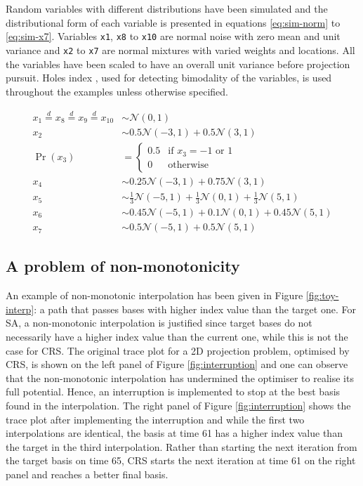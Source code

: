 Random variables with different distributions have been simulated and
the distributional form of each variable is presented in equations
\ref{eq:sim-norm} to \ref{eq:sim-x7}. Variables \texttt{x1}, \texttt{x8}
to \texttt{x10} are normal noise with zero mean and unit variance and
\texttt{x2} to \texttt{x7} are normal mixtures with varied weights and
locations. All the variables have been scaled to have an overall unit
variance before projection pursuit. Holes index \citep{cook2008grand},
used for detecting bimodality of the variables, is used throughout the
examples unless otherwise specified.

\begin{align}
x_1 \overset{d}{=} x_8 \overset{d}{=} x_9 \overset{d}{=} x_{10}& \sim \mathcal{N}(0, 1) \label{eq:sim-norm} \\
x_2 &\sim 0.5 \mathcal{N}(-3, 1) + 0.5 \mathcal{N}(3, 1)\label{eq:sim-x2}\\
\Pr(x_3) &= 
\begin{cases}
0.5 & \text{if $x_3 = -1$ or $1$}\\
0 & \text{otherwise}
\end{cases}\label{eq:sim-x3}\\
x_4 &\sim 0.25 \mathcal{N}(-3, 1) + 0.75 \mathcal{N}(3, 1) \label{eq:sim-x4}\\
x_5 &\sim \frac{1}{3} \mathcal{N}(-5, 1) + \frac{1}{3} \mathcal{N}(0, 1) + \frac{1}{3} \mathcal{N}(5, 1)\label{eq:sim-x5}\\
x_6 &\sim 0.45 \mathcal{N}(-5, 1) + 0.1 \mathcal{N}(0, 1) + 0.45 \mathcal{N}(5, 1)\label{eq:sim-x6}\\
x_7 &\sim 0.5 \mathcal{N}(-5, 1) + 0.5 \mathcal{N}(5, 1) 
\label{eq:sim-x7}
\end{align}

\hypertarget{monotonic}{%
\subsection{A problem of non-monotonicity}\label{monotonic}}

An example of non-monotonic interpolation has been given in Figure
\ref{fig:toy-interp}: a path that passes bases with higher index value
than the target one. For SA, a non-monotonic interpolation is justified
since target bases do not necessarily have a higher index value than the
current one, while this is not the case for CRS. The original trace plot
for a 2D projection problem, optimised by CRS, is shown on the left
panel of Figure \ref{fig:interruption} and one can observe that the
non-monotonic interpolation has undermined the optimiser to realise its
full potential. Hence, an interruption is implemented to stop at the
best basis found in the interpolation. The right panel of Figure
\ref{fig:interruption} shows the trace plot after implementing the
interruption and while the first two interpolations are identical, the
basis at time 61 has a higher index value than the target in the third
interpolation. Rather than starting the next iteration from the target
basis on time 65, CRS starts the next iteration at time 61 on the right
panel and reaches a better final basis.

